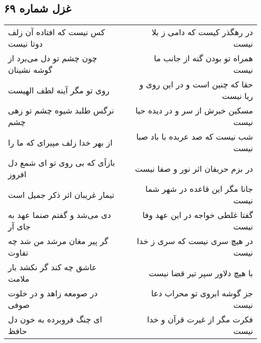 \begin{center}
\section*{غزل شماره ۶۹}
\label{sec:sh069}
\begin{longtable}{l p{0.5cm} r}
کس نیست که افتاده آن زلف دوتا نیست
&&
در رهگذر کیست که دامی ز بلا نیست
\\
چون چشم تو دل می‌برد از گوشه نشینان
&&
همراه تو بودن گنه از جانب ما نیست
\\
روی تو مگر آینه لطف الهیست
&&
حقا که چنین است و در این روی و ریا نیست
\\
نرگس طلبد شیوه چشم تو زهی چشم
&&
مسکین خبرش از سر و در دیده حیا نیست
\\
از بهر خدا زلف مپیرای که ما را
&&
شب نیست که صد عربده با باد صبا نیست
\\
بازآی که بی روی تو ای شمع دل افروز
&&
در بزم حریفان اثر نور و صفا نیست
\\
تیمار غریبان اثر ذکر جمیل است
&&
جانا مگر این قاعده در شهر شما نیست
\\
دی می‌شد و گفتم صنما عهد به جای آر
&&
گفتا غلطی خواجه در این عهد وفا نیست
\\
گر پیر مغان مرشد من شد چه تفاوت
&&
در هیچ سری نیست که سری ز خدا نیست
\\
عاشق چه کند گر نکشد بار ملامت
&&
با هیچ دلاور سپر تیر قضا نیست
\\
در صومعه زاهد و در خلوت صوفی
&&
جز گوشه ابروی تو محراب دعا نیست
\\
ای چنگ فروبرده به خون دل حافظ
&&
فکرت مگر از غیرت قرآن و خدا نیست
\\
\end{longtable}
\end{center}
